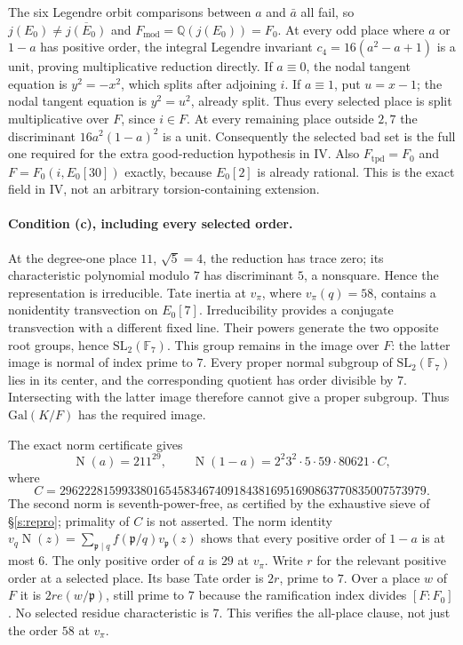 \documentclass[11pt]{article}
\theoremstyle{plain}
\theoremstyle{definition}
\newcommand{\Fmod}{F_{\mathrm{mod}}}
\newcommand{\Norm}{\operatorname{N}}
\begin{document}
The six Legendre orbit comparisons between $a$ and $\bar a$ all fail, so
$j(E_0)\ne\overline{j(E_0)}$ and $\Fmod=\mathbb Q(j(E_0))=F_0$.
At every odd place where $a$ or $1-a$ has positive order, the integral
Legendre invariant $c_4=16(a^2-a+1)$ is a unit, proving multiplicative
reduction directly.  If $a\equiv0$, the nodal tangent equation is
$y^2=-x^2$, which splits after adjoining $i$.  If $a\equiv1$, put
$u=x-1$; the nodal tangent equation is $y^2=u^2$, already split.
Thus every selected place is split multiplicative over $F$, since $i\in F$.
At every remaining place outside $2,7$ the discriminant
$16a^2(1-a)^2$ is a unit.  Consequently the selected bad set is the full
one required for the extra good-reduction hypothesis in IV.  Also
$F_{\mathrm{tpd}}=F_0$ and $F=F_0(i,E_0[30])$ exactly, because $E_0[2]$
is already rational.  This is the exact field in IV, not an arbitrary
torsion-containing extension.

\paragraph{Condition (c), including every selected order.}
At the degree-one place $11$, $\sqrt5=4$, the reduction has trace zero;
its characteristic polynomial modulo $7$ has discriminant $5$, a
nonsquare.  Hence the representation is irreducible.  Tate inertia at
$v_\pi$, where $v_\pi(q)=58$, contains a nonidentity transvection on
$E_0[7]$.  Irreducibility provides a conjugate transvection with a different
fixed line.  Their powers generate the two opposite root groups, hence
$\mathrm{SL}_2(\mathbb F_7)$.  This group remains in the image over $F$:
the latter image is normal of index prime to $7$.  Every proper normal
subgroup of $\mathrm{SL}_2(\mathbb F_7)$ lies in its center, and the
corresponding quotient has order divisible by $7$.  Intersecting with the
latter image therefore cannot give a proper subgroup.
Thus $\mathrm{Gal}(K/F)$ has the required image.

The exact norm certificate gives
\[
 \Norm(a)=211^{29},\qquad
 \Norm(1-a)=2^2 3^2\cdot5\cdot59\cdot80621\cdot C,
\]
where
\[
 C=29622281599338016545834674091843816951690863770835007573979.
\]
The second norm is seventh-power-free, as certified by the exhaustive
sieve of \S\ref{s:repro}; primality of $C$ is not asserted.
The norm identity $v_q\Norm(z)=\sum_{\mathfrak p\mid q}
f(\mathfrak p/q)v_\mathfrak p(z)$ shows that every positive order of
$1-a$ is at most $6$.  The only positive order of $a$ is $29$ at
$v_\pi$.  Write $r$ for the relevant positive order at a selected place.
Its base Tate order is $2r$, prime to $7$.  Over a place $w$ of $F$ it
is $2r e(w/\mathfrak p)$, still prime to $7$ because the ramification
index divides $[F:F_0]$.  No selected residue characteristic is $7$.
This verifies the all-place clause, not just the order $58$ at $v_\pi$.
\end{document}
